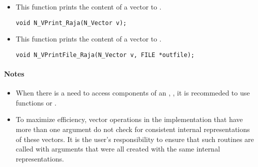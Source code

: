 \begin{itemize}

\item {}

  This function prints the content of a {\raja} vector to .

  \verb|void N_VPrint_Raja(N_Vector v);|


\item {}

  This function prints the content of a {\raja} vector to .

  \verb|void N_VPrintFile_Raja(N_Vector v, FILE *outfile);|


\end{itemize}
\paragraph{\bf Notes}

\begin{itemize}

\item
  When there is a need to access components of an , ,
  it is recommeded to use functions  or
  .


\item
  {\warn}To maximize efficiency, vector operations in the {\nvecraja} implementation
  that have more than one  argument do not check for
  consistent internal representations of these vectors. It is the user's
  responsibility to ensure that such routines are called with 
  arguments that were all created with the same internal representations.

\end{itemize}

